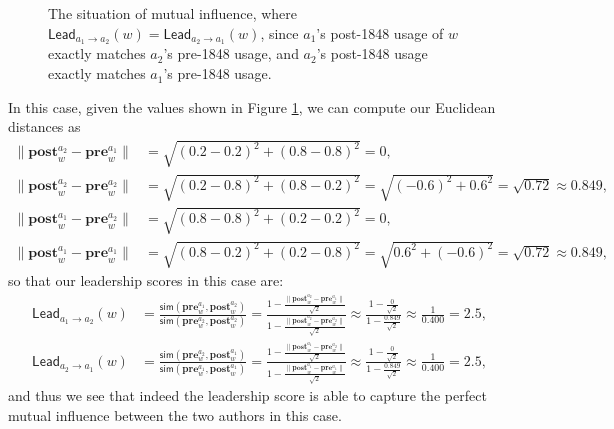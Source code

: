 \documentclass[11pt]{article}
\newcommand{\prevec}[2]{\mathbf{pre}_{#1}^{#2}}
\newcommand{\postvec}[2]{\mathbf{post}_{#1}^{#2}}
\newcommand{\Lead}[2]{\mathsf{Lead}_{#1 \rightarrow #2}}
\newcommand{\Sim}[0]{\mathsf{sim}}
\begin{document}
\begin{figure}[ht!]
	\centering
	
	\caption{The situation of mutual influence, where $\mathsf{Lead}_{a_1 \rightarrow a_2}(w) = \mathsf{Lead}_{a_2 \rightarrow a_1}(w)$, since $a_1$'s post-1848 usage of $w$ exactly matches $a_2$'s pre-1848 usage, and $a_2$'s post-1848 usage exactly matches $a_1$'s pre-1848 usage.}
	\label{fig:mutualinfluence}
\end{figure}

In this case, given the values shown in Figure \ref{fig:mutualinfluence}, we can compute our Euclidean distances as
\begin{align*}
	\|\postvec{w}{a_2} - \prevec{w}{a_1}\| &= \sqrt{(0.2-0.2)^2 + (0.8-0.8)^2} = 0,\\
	\|\postvec{w}{a_2} - \prevec{w}{a_2}\| &= \sqrt{(0.2-0.8)^2 + (0.8-0.2)^2} = \sqrt{(-0.6)^2 + 0.6^2} = \sqrt{0.72} \approx 0.849,\\
	\|\postvec{w}{a_1} - \prevec{w}{a_2}\| &= \sqrt{(0.8-0.8)^2 + (0.2-0.2)^2} = 0,\\
	\|\postvec{w}{a_1} - \prevec{w}{a_1}\| &= \sqrt{(0.8-0.2)^2 + (0.2-0.8)^2} = \sqrt{0.6^2 + (-0.6)^2} = \sqrt{0.72} \approx 0.849,
\end{align*}
so that our leadership scores in this case are:
\begin{align*}
	\Lead{a_1}{a_2}(w) &= \frac{\Sim(\prevec{w}{a_1}, \postvec{w}{a_2})}{\Sim(\prevec{w}{a_2}, \postvec{w}{a_2})} = \frac{1-\frac{\|\postvec{w}{a_2} - \prevec{w}{a_1}\|}{\sqrt{2}}}{1-\frac{\|\postvec{w}{a_2} - \prevec{w}{a_2}\|}{\sqrt{2}}} \approx \frac{1-\frac{0}{\sqrt{2}}}{1-\frac{0.849}{\sqrt{2}}} \approx \frac{1}{0.400} = 2.5,\\
	\Lead{a_2}{a_1}(w) &= \frac{\Sim(\prevec{w}{a_2}, \postvec{w}{a_1})}{\Sim(\prevec{w}{a_1}, \postvec{w}{a_1})} =
	\frac{1-\frac{\|\postvec{w}{a_1} - \prevec{w}{a_2}\|}{\sqrt{2}}}{1-\frac{\|\postvec{w}{a_1} - \prevec{w}{a_1}\|}{\sqrt{2}}} \approx \frac{1-\frac{0}{\sqrt{2}}}{1-\frac{0.849}{\sqrt{2}}} \approx \frac{1}{0.400} = 2.5,
\end{align*}
and thus we see that indeed the leadership score is able to capture the perfect mutual influence between the two authors in this case.
\end{document}
